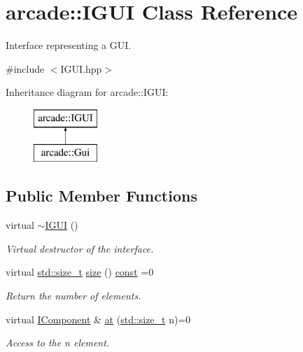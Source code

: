 \hypertarget{classarcade_1_1_i_g_u_i}{\section{arcade\-:\-:I\-G\-U\-I Class Reference}
\label{classarcade_1_1_i_g_u_i}
}


Interface representing a G\-U\-I.  




{\ttfamily \#include $<$I\-G\-U\-I.\-hpp$>$}

Inheritance diagram for arcade\-:\-:I\-G\-U\-I\-:\begin{figure}[H]
\begin{center}
\leavevmode
\includegraphics[height=2.000000cm]{classarcade_1_1_i_g_u_i}
\end{center}
\end{figure}
\subsection*{Public Member Functions}
\begin{DoxyCompactItemize}
\item 
virtual \hyperlink{classarcade_1_1_i_g_u_i_ae93e1b1b586b51ebfc760d35c0af3ba3}{$\sim$\-I\-G\-U\-I} ()
\begin{DoxyCompactList}\small\item\em Virtual destructor of the interface. \end{DoxyCompactList}\item 
virtual \hyperlink{nc__alloc_8h_a7b60c5629e55e8ec87a4547dd4abced4}{std\-::size\-\_\-t} \hyperlink{classarcade_1_1_i_g_u_i_a5e9b36772c4affcc58243880e6d51d62}{size} () \hyperlink{term__entry_8h_a57bd63ce7f9a353488880e3de6692d5a}{const} =0
\begin{DoxyCompactList}\small\item\em Return the number of elements. \end{DoxyCompactList}\item 
virtual \hyperlink{classarcade_1_1_i_component}{I\-Component} \& \hyperlink{classarcade_1_1_i_g_u_i_aafde8788a75c98d0dfc1161e42e13558}{at} (\hyperlink{nc__alloc_8h_a7b60c5629e55e8ec87a4547dd4abced4}{std\-::size\-\_\-t} n)=0
\begin{DoxyCompactList}\small\item\em Access to the n element. \end{DoxyCompactList}\end{DoxyCompactItemize}



